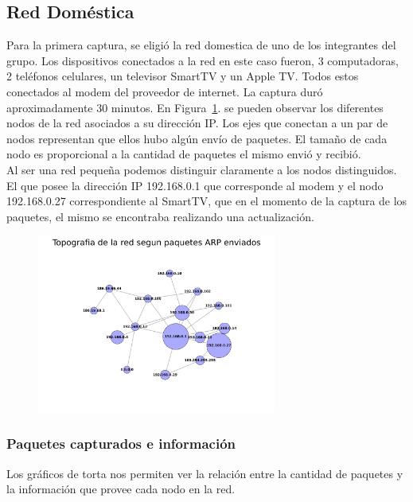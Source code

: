 \subsection{Red Doméstica}

Para la primera captura, se eligió la red domestica de uno de los integrantes del grupo. Los dispositivos conectados a la red en este caso fueron, 3 computadoras, 2 teléfonos celulares, un televisor SmartTV y un Apple TV. Todos estos conectados al modem del proveedor de internet.
La captura duró aproximadamente 30 minutos.
En Figura~\ref{fig:red_domestica_network}. se pueden observar los diferentes nodos de la red asociados a su dirección IP. Los ejes que conectan a un par de nodos representan que ellos hubo algún envío de paquetes. El tamaño de cada nodo es proporcional a la cantidad de paquetes el mismo envió y recibió.
\\
Al ser una red pequeña podemos distinguir claramente a los nodos distinguidos. El que posee la dirección IP 192.168.0.1 que corresponde al modem y el nodo 192.168.0.27 correspondiente al SmartTV, que en el momento de la captura de los paquetes, el mismo se encontraba realizando una actualización.

\begin{figure}[h!]
  \centering
   \includegraphics[width=0.7\textwidth]{graficos/red_domestica_network.png}
  \caption{}
  \label{fig:red_domestica_network}
\end{figure}

\FloatBarrier

\subsubsection{Paquetes capturados e información}

Los gráficos de torta nos permiten ver la relación entre la cantidad de paquetes y la información que provee cada nodo en la red. 

